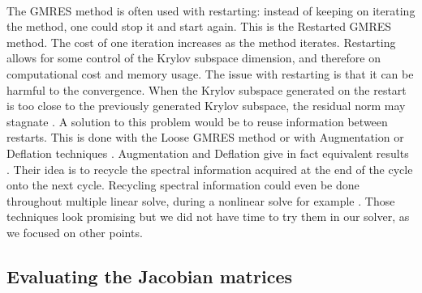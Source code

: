       \paragraph{}
      The GMRES method is often used with restarting: instead of keeping on iterating the method, one could stop it and start again.
      This is the Restarted GMRES method.
      The cost of one iteration increases as the method iterates.
      Restarting allows for some control of the Krylov subspace dimension, and therefore on computational cost and memory usage.
      The issue with restarting is that it can be harmful to the convergence.
      When the Krylov subspace generated on the restart is too close to the previously generated Krylov subspace, the residual norm may stagnate \cite{Simoncini1999}.
      A solution to this problem would be to reuse information between restarts.
      This is done with the Loose GMRES method \cite{BakerJessupManteuffel2005} or with Augmentation or Deflation techniques  \cite{ChapmanSaad1997, Morgan2002, RamosKehlNabben2020}.
      Augmentation and Deflation give in fact equivalent results \cite{CoulaudGiraudRametEtAl2013}.
      Their idea is to recycle the spectral information acquired at the end of the cycle onto the next cycle.
      Recycling spectral information could even be done throughout multiple linear solve, during a nonlinear solve for example \cite{Gaul2014}.
      Those techniques look promising but we did not have time to try them in our solver, as we focused on other points.


    \subsection{Evaluating the Jacobian matrices}

